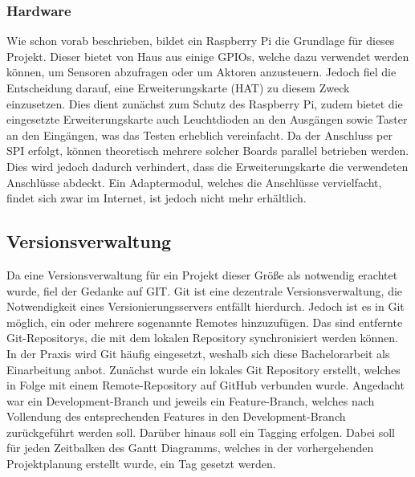 \subsubsection{Hardware}\label{chp:gundl:hardware}
Wie schon vorab beschrieben, bildet ein Raspberry Pi die Grundlage für dieses Projekt. Dieser bietet von Haus aus einige GPIOs, welche  dazu  verwendet werden können, um Sensoren abzufragen oder um Aktoren anzusteuern. Jedoch fiel die Entscheidung darauf, eine Erweiterungskarte (HAT) zu diesem Zweck einzusetzen. Dies dient zunächst zum Schutz des Raspberry Pi, zudem bietet die eingesetzte Erweiterungskarte auch Leuchtdioden an den Ausgängen sowie Taster an den Eingängen, was das Testen erheblich vereinfacht. Da der Anschluss per SPI erfolgt, können theoretisch mehrere solcher Boards parallel betrieben werden. Dies wird jedoch dadurch verhindert, dass die Erweiterungskarte die verwendeten Anschlüsse abdeckt. Ein Adaptermodul, welches die Anschlüsse vervielfacht, findet sich zwar im Internet, ist jedoch nicht mehr erhältlich. 

\subsection{Versionsverwaltung}
Da eine Versionsverwaltung für ein Projekt dieser Größe als notwendig erachtet wurde, fiel der Gedanke auf GIT.\cite{URL:GIT} Git ist eine dezentrale Versionsverwaltung, die Notwendigkeit eines Versionierungsservers entfällt hierdurch. Jedoch ist es in Git möglich, ein oder mehrere sogenannte Remotes hinzuzufügen. Das sind entfernte Git-Repositorys, die mit dem lokalen Repository synchronisiert werden können. In der Praxis wird Git häufig eingesetzt, weshalb sich diese Bachelorarbeit als Einarbeitung anbot. Zunächst wurde ein lokales Git Repository erstellt, welches in Folge mit einem Remote-Repository auf GitHub verbunden wurde. Angedacht war ein Development-Branch und jeweils ein Feature-Branch, welches nach Vollendung des entsprechenden Features in den Development-Branch zurückgeführt werden soll. Darüber hinaus soll ein Tagging erfolgen. Dabei soll für jeden Zeitbalken des Gantt Diagramms, welches in der vorhergehenden Projektplanung erstellt wurde, ein Tag gesetzt werden. 

